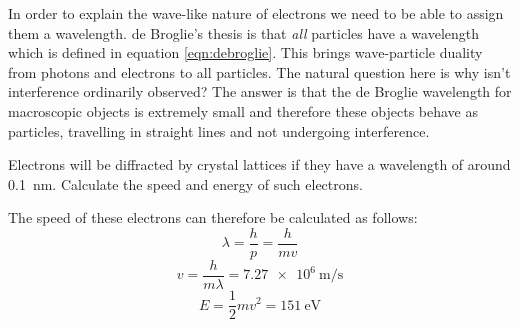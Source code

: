\documentclass[revision-guide.tex]{subfiles}
\begin{document}
\clearpage


In order to explain the wave-like nature of electrons we need to be able to assign them a wavelength. de Broglie's thesis is that \emph{all} particles have a wavelength which is defined in equation \ref{eqn:debroglie}. This brings wave-particle duality from photons and electrons to all particles. The natural question here is why isn't interference ordinarily observed? The answer is that the de Broglie wavelength for macroscopic objects is extremely small and therefore these objects behave as particles, travelling in straight lines and not undergoing interference.

\begin{example}
Electrons will be diffracted by crystal lattices if they have a wavelength of around \SI{0.1}{\nano\metre}. Calculate the speed and energy of such electrons.

\answer
The speed of these electrons can therefore be calculated as follows:
\[ \lambda = \frac{h}{p} = \frac{h}{mv} \]
\[ v = \frac{h}{m\lambda} = \SI{7.27e6}{\meter\per\second} \]
\[ E = \frac{1}{2}mv^2 = \SI{151}{\electronvolt} \]

\end{example}
\end{document}

